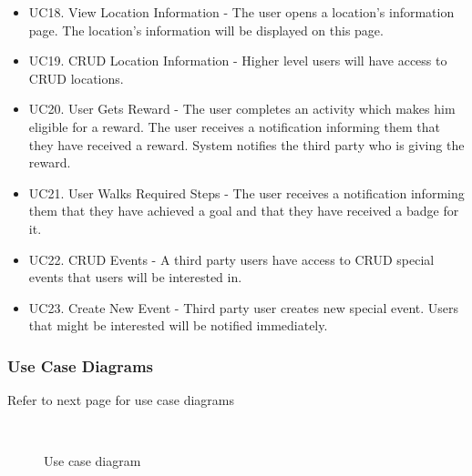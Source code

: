\documentclass[11pt]{article}
\begin{document}
\begin{itemize}
			\item UC18. View Location Information - The user opens a location’s information page. The location’s information will be displayed on this page.
			\item UC19. CRUD Location Information - Higher level users will have access to CRUD locations.
			\item UC20. User Gets Reward - The user completes an activity which makes him eligible for a reward. The user receives a notification informing them that they have received a reward. System notifies the third party who is giving the reward.
			\item UC21. User Walks Required Steps - The user receives a notification informing them that they have achieved a goal and that they have received a badge for it.
			\item UC22. CRUD Events - A third party users have access to CRUD special events that users will be interested in.
			\item UC23. Create New Event - Third party user creates new special event. Users that might be interested will be notified immediately.
		\end{itemize}
		
		\subsubsection{Use Case Diagrams}
		Refer to next page for use case diagrams
		\begin{figure}[p]
			\vspace*{-2.7cm}
			\centering
			\\[2cm]
			\caption{Use case diagram}
		\end{figure} 
		
\end{document}

